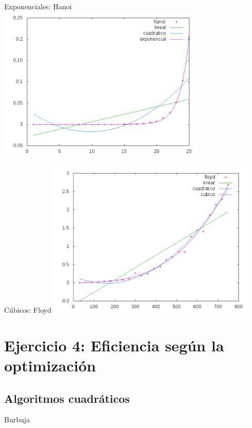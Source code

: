 \documentclass[10pt,compress,usetitleprogressbar,mathserif]{beamer}
\begin{document}
\begin{frame}{Exponenciales: Hanoi}
	\includegraphics[width = 10cm ]{img/expo_hibrida2.pdf}
\end{frame}

\begin{frame}{Cúbicos: Floyd}
	\includegraphics[width = 10cm ]{img/floyd_hibrida.pdf}
\end{frame}

\section{Ejercicio 4: \large{Eficiencia según la optimización }}

\subsection{Algoritmos cuadráticos}

\begin{frame}{Burbuja}
	
\end{frame}
\end{document}

